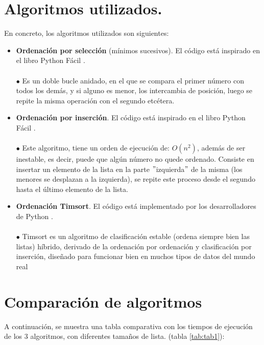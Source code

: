 \documentclass[a4,12pt]{article}
\begin{document}
	\section{Algoritmos utilizados.}
	En concreto, los algoritmos utilizados son siguientes:
	\begin{itemize}
		\item \textbf{Ordenación por selección} (mínimos sucesivos).
			\subitem El código está inspirado en el libro Python Fácil \cite{python_facil}. \\\\ $\bullet$ Es un doble bucle anidado, en el que se compara el primer número con todos los demás, y si alguno es menor, los intercambia de posición, luego se repite la misma operación con el segundo etcétera.
		\item \textbf{Ordenación por inserción}.
			\subitem El código está inspirado en el libro Python Fácil \cite{python_facil}. \\\\ $\bullet$ Este algoritmo, tiene un orden de ejecución de: $O(n^{2})$, además de ser inestable, es decir, puede que algún número no quede ordenado. Consiste en insertar un elemento de la lista en la parte $"$izquierda$"$ de la misma (los menores se desplazan a la izquierda), se repite este proceso desde el segundo hasta el último elemento de la lista.
		\item \textbf{Ordenación Timsort}.
			\subitem El código está implementado por los desarrolladores de Python \cite{manual}.\\\\ $\bullet$ Timsort es un algoritmo de clasificación estable (ordena siempre bien las listas) híbrido, derivado de la ordenación por ordenación y clasificación por inserción, diseñado para funcionar bien en muchos tipos de datos del mundo real
	\end{itemize}
	
	
	\section{Comparación de algoritmos}
	

	A continuación, se muestra una tabla comparativa con los tiempos de ejecución de los 3 algoritmos, con diferentes tamaños de lista. (tabla \ref{tab:tab1}):
	
\end{document}
